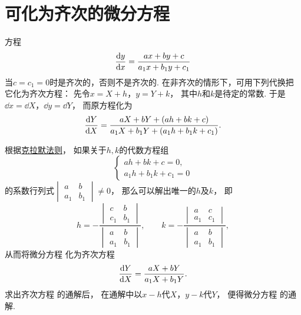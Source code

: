 \section{可化为齐次的微分方程}
方程\begin{equation}\label{equation:微分方程.可化为齐次的方程}
	\dv{y}{x} = \frac{ax + by + c}{a_1 x + b_1 y + c_1}
\end{equation}
当\(c=c_1=0\)时是齐次的，否则不是齐次的.
在非齐次的情形下，可用下列代换把它化为齐次方程：
先令\(x = X + h\)，\(y = Y + k\)，
其中\(h\)和\(k\)是待定的常数.
于是\(\dd{x}=\dd{X}\)，\(\dd{y}=\dd{Y}\)，
而原方程化为\begin{equation*}
	\dv{Y}{X} = \frac{aX+bY+(ah+bk+c)}{a_1 X+b_1 Y+(a_1 h+b_1 k+c_1)}.
\end{equation*}

根据\hyperref[theorem:线性方程组.克拉默法则]{克拉默法则}，
如果关于\(h,k\)的代数方程组\begin{equation}\label{equation:微分方程.可化为齐次的方程.待定系数的代数方程}
	\left\{ \begin{array}{l}
		ah+bk+c = 0, \\
		a_1 h+b_1 k+c_1 = 0
	\end{array} \right.
\end{equation}的系数行列式\(\begin{vmatrix}
	a & b \\
	a_1 & b_1
\end{vmatrix} \neq 0\)，
那么可以解出唯一的\(h\)及\(k\)，
即\begin{equation*}
	h = -\frac{\begin{vmatrix}
		c & b \\
		c_1 & b_1
	\end{vmatrix}}{\begin{vmatrix}
		a & b \\
		a_1 & b_1
	\end{vmatrix}},
	\qquad
	k = -\frac{\begin{vmatrix}
		a & c \\
		a_1 & c_1
	\end{vmatrix}}{\begin{vmatrix}
		a & b \\
		a_1 & b_1
	\end{vmatrix}},
\end{equation*}
从而将微分方程 
化为齐次方程\begin{equation}\label{equation:微分方程.可化为齐次的方程.换元得到的齐次方程1}
	\dv{Y}{X} = \frac{aX+bY}{a_1 X+b_1 Y}.
\end{equation}
求出齐次方程  的通解后，
在通解中以\(x-h\)代\(X\)，\(y-k\)代\(Y\)，
便得微分方程  的通解.

